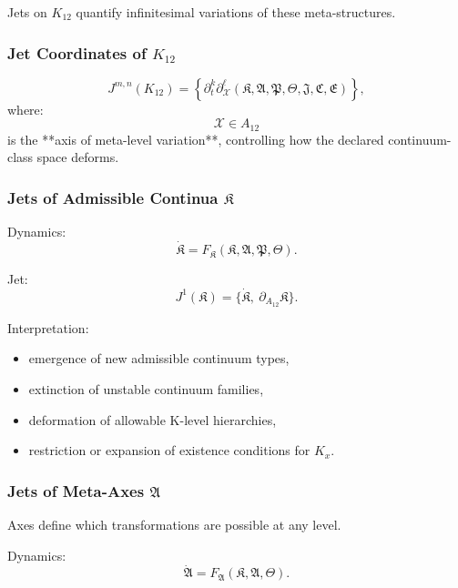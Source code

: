Jets on $K_{12}$ quantify infinitesimal variations of these meta-structures.


\subsubsection{Jet Coordinates of $K_{12}$}

\[
J^{m,n}(K_{12}) =
\left\{
\partial_t^k \partial_{\mathcal{X}}^\ell 
(\mathfrak{K},\mathfrak{A},\mathfrak{P},\mathfrak{\Theta},\mathfrak{J},\mathfrak{C},\mathfrak{E})
\right\},
\]
where:
\[
\mathcal{X} \in A_{12}
\]
is the **axis of meta-level variation**, controlling how the declared continuum-class space deforms.


\subsubsection{Jets of Admissible Continua $\mathfrak{K}$}

Dynamics:
\[
\dot{\mathfrak{K}}
=
F_{\mathfrak{K}}(\mathfrak{K},\mathfrak{A},\mathfrak{P},\mathfrak{\Theta}).
\]

Jet:
\[
J^1(\mathfrak{K})
= \{\dot{\mathfrak{K}},\ \partial_{A_{12}}\mathfrak{K}\}.
\]

Interpretation:
\begin{itemize}
    \item emergence of new admissible continuum types,
    \item extinction of unstable continuum families,
    \item deformation of allowable K-level hierarchies,
    \item restriction or expansion of existence conditions for $K_x$.
\end{itemize}


\subsubsection{Jets of Meta-Axes $\mathfrak{A}$}

Axes define which transformations are possible at any level.

Dynamics:
\[
\dot{\mathfrak{A}}
=
F_{\mathfrak{A}}(\mathfrak{K},\mathfrak{A},\mathfrak{\Theta}).
\]

